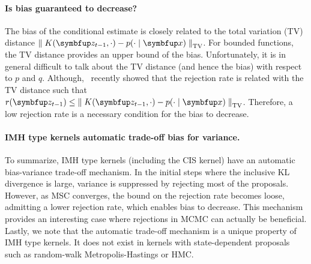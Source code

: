 \paragraph{Is bias guaranteed to decrease?}
The bias of the conditional estimate is closely related to the total variation (TV) distance \(\DTV{K(\vz_{t-1}, \cdot)}{p(\cdot\mid\vx)}\).
For bounded functions, the TV distance provides an upper bound of the bias.
Unfortunately, it is in general difficult to talk about the TV distance (and hence the bias) with respect to \(p\) and \(q\).
Although,~\citet{wang_exact_2020} recently showed that the rejection rate is related with the TV distance such that \(r(\vz_{t-1}) \leq \DTV{K(\vz_{t-1}, \cdot)}{p(\cdot\mid\vx)}\).
Therefore, a low rejection rate is a necessary condition for the bias to decrease.

\vspace{-0.1in}
\paragraph{IMH type kernels automatic trade-off bias for variance.}
To summarize, IMH type kernels (including the CIS kernel) have an automatic bias-variance trade-off mechanism.
In the initial steps where the inclusive KL divergence is large, variance is suppressed by rejecting most of the proposals.
However, as MSC converges, the bound on the rejection rate becomes loose, admitting a lower rejection rate, which enables bias to decrease.
This mechanism provides an interesting case where rejections in MCMC can actually be beneficial.
Lastly, we note that the automatic trade-off mechanism is a unique property of IMH type kernels.
It does not exist in kernels with state-dependent proposals such as random-walk Metropolis-Hastings or HMC.




